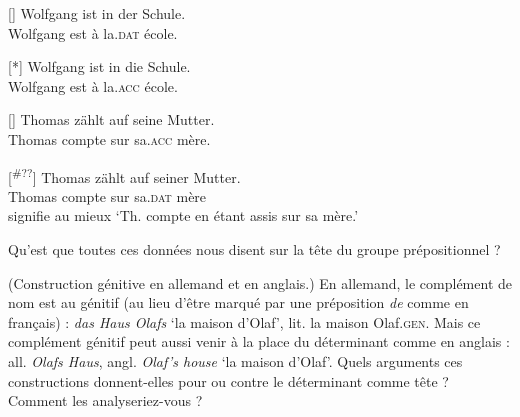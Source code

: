 {    \begin{exe}
    []{
    \gll   Wolfgang ist in der Schule.\\
    Wolfgang est à la.\textsc{dat} école.\\}

    [*]{
    \gll   Wolfgang ist in die Schule. \\
    Wolfgang est à la.\textsc{acc} école.\\}

    []{
    \gll Thomas zählt auf seine Mutter.\\
    Thomas compte sur sa.\textsc{acc} mère.\\}

    [\textsuperscript{\#??}]{
    \gll Thomas zählt auf seiner Mutter.\\
    Thomas compte sur sa.\textsc{dat} mère \\
    \glt    signifie au mieux ‘Th. compte en étant assis sur sa mère.’}
    \end{exe}

    \noindent Qu’est que toutes ces données nous disent sur la tête du groupe prépositionnel ?

     ({Construction génitive en allemand et en anglais.}) En allemand, le complément de nom est au génitif (au lieu d’être marqué par une préposition \textit{de} comme en français) : \textit{das Haus Olafs} ‘la maison d’Olaf’, lit. la maison Olaf.\textsc{gen}. Mais ce complément génitif peut aussi venir à la place du déterminant comme en anglais : all. \textit{Olafs Haus}, angl. \textit{Olaf’s house} ‘la maison d’Olaf’. Quels arguments ces constructions donnent-elles pour ou contre le déterminant comme tête ? Comment les analyseriez-vous ?
}
